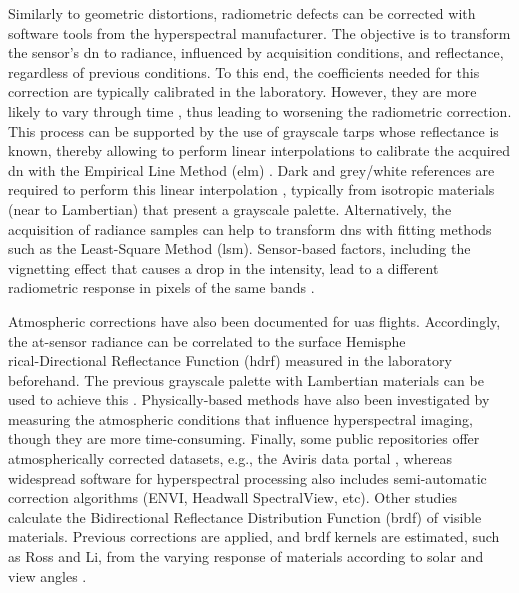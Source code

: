 Similarly to geometric distortions, radiometric defects can be corrected with software tools from the hyperspectral manufacturer. The objective is to transform the sensor's \acrshort{dn} to radiance, influenced by acquisition conditions, and reflectance, regardless of previous conditions. To this end, the coefficients needed for this correction are typically calibrated in the laboratory. However, they are more likely to vary through time \cite{adao_hyperspectral_2017}, thus leading to worsening the radiometric correction. This process can be supported by the use of grayscale tarps whose reflectance is known, thereby allowing to perform linear interpolations to calibrate the acquired \acrshort{dn} \cite{lucieer_hyperuasimaging_2014} with the Empirical Line Method (\acrshort{elm}) \cite{aasen_quantitative_2018, sousa_uav-based_2022}. Dark and grey/white references are required to perform this linear interpolation \cite{jakob_need_2017, sagan_data-driven_2022, duan_land_2013}, typically from isotropic materials (near to Lambertian) that present a grayscale palette. Alternatively, the acquisition of radiance samples can help to transform \acrshort{dn}s with fitting methods such as the Least-Square Method (\acrshort{lsm}). Sensor-based factors, including the vignetting effect that causes a drop in the intensity, lead to a different radiometric response in pixels of the same bands \cite{yang_dom_2017}.

Atmospheric corrections have also been documented for \acrshort{uas} flights. Accordingly, the at-sensor radiance can be correlated to the surface Hemisphe\\rical-Directional Reflectance Function (\acrshort{hdrf}) measured in the laboratory beforehand. The previous grayscale palette with Lambertian materials can be used to achieve this \cite{lucieer_hyperuasimaging_2014}. Physically-based methods have also been investigated by measuring the atmospheric conditions that influence hyperspectral imaging, though they are more time-consuming. Finally, some public repositories offer atmospherically corrected datasets, e.g., the Aviris data portal \cite{california_institute_of_technology_aviris_nodate}, whereas widespread software for hyperspectral processing also includes semi-automatic correction algorithms (ENVI, Headwall SpectralView, etc). Other studies calculate the Bidirectional Reflectance Distribution Function (\acrshort{brdf}) of visible materials. Previous corrections are applied, and \acrshort{brdf} kernels are estimated, such as Ross and Li, from the varying response of materials according to solar and view angles \cite{queally_flexbrdf_2022, jia_kernel-driven_2020, sagan_data-driven_2022}.


